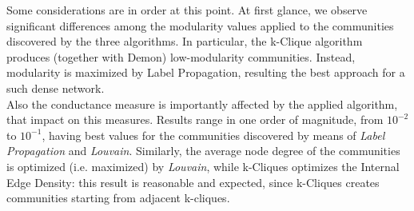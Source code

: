 \documentclass[sigchi]{acmart}
\begin{document}
Some considerations are in order at this point. At first glance, we observe significant differences among the modularity values applied to the communities discovered by the three algorithms. In particular, the k-Clique algorithm produces (together with Demon) low-modularity communities. Instead, modularity is maximized by Label Propagation, resulting the best approach for a such dense network. \\
Also the conductance measure is importantly affected by the applied algorithm, that impact on this measures. Results range in one order of magnitude, from $10^{-2}$ to $10^{-1}$, having best values for the communities discovered by means of \textit{Label Propagation} and \textit{Louvain}. 
Similarly, the average node degree of the communities is optimized (i.e. maximized) by \textit{Louvain}, while k-Cliques optimizes the Internal Edge Density: this result is reasonable and expected, since k-Cliques creates communities starting from adjacent k-cliques.
\end{document}

